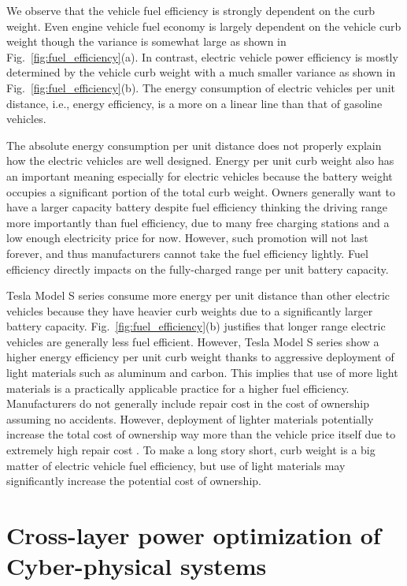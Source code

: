 \documentclass[journal]{IEEEtran}
\begin{document}
We observe that the vehicle fuel efficiency is strongly dependent on the curb weight. 
Even engine vehicle fuel economy is largely dependent on the vehicle curb weight though the variance is somewhat large as shown in Fig.~\ref{fig:fuel_efficiency}(a). In contrast, electric vehicle power efficiency is mostly determined by the vehicle curb weight with a much smaller variance as shown in Fig.~\ref{fig:fuel_efficiency}(b). The energy consumption of electric vehicles per unit distance, i.e., energy efficiency, is a more on a linear line than that of gasoline vehicles.  

The absolute energy consumption per unit distance does not properly explain how the electric vehicles are well designed. 
Energy per unit curb weight also has an important meaning especially for electric vehicles because the battery weight occupies a significant portion of the total curb weight. 
Owners generally want to have a larger capacity battery despite fuel efficiency thinking the driving range more importantly than fuel efficiency, due to many free charging stations and a low enough electricity price for now. However, such promotion will not last forever, and thus manufacturers cannot take the fuel efficiency lightly. Fuel efficiency directly impacts on the fully-charged range per unit battery capacity. 

Tesla Model S series consume more energy per unit distance than other electric vehicles because they have heavier curb weights due to a significantly larger battery capacity. Fig.~\ref{fig:fuel_efficiency}(b) justifies that longer range electric vehicles are generally less fuel efficient. However, Tesla Model S series show a higher energy efficiency per unit curb weight thanks to aggressive deployment of light materials such as aluminum and carbon.  
This implies that use of more light materials is a practically applicable practice for a higher fuel efficiency. Manufacturers do not generally include repair cost in the cost of ownership assuming no accidents. However, deployment of lighter materials potentially increase the total cost of ownership way more than the vehicle price itself due to extremely high repair cost \cite{Repair_cost}. To make a long story short, curb weight is a big matter of electric vehicle fuel efficiency, but use of light materials may significantly increase the potential cost of ownership.

\section{Cross-layer power optimization of Cyber-physical systems}
\end{document}
